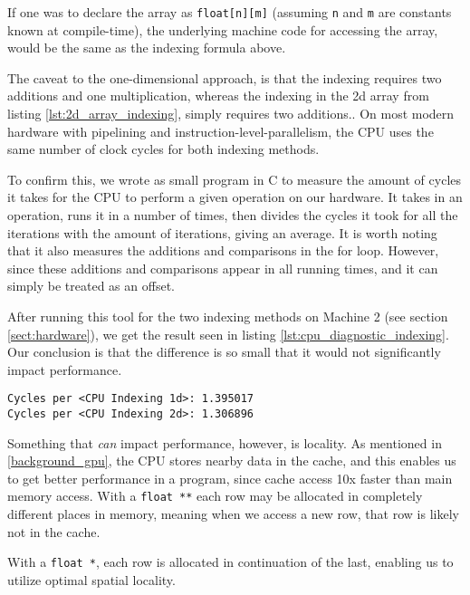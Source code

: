 If one was to declare the array as \texttt{float[n][m]} (assuming \texttt{n} and \texttt{m} are constants known at compile-time), the underlying machine code for accessing the array, would be the same as the indexing formula above.\cite[Ch. 1.2]{numericalrecipes}

The caveat to the one-dimensional approach, is that the indexing requires two additions and one multiplication, whereas the indexing in the 2d array from listing \ref{lst:2d_array_indexing}, simply requires two additions.\cite{numericalrecipes}. On most modern hardware with pipelining and instruction-level-parallelism, the CPU uses the same number of clock cycles for both indexing methods.

To confirm this, we wrote as small program in C to measure the amount of cycles it takes for the CPU to perform a given operation on our hardware. It takes in an operation, runs it in a number of times, then divides the cycles it took for all the iterations with the amount of iterations, giving an average. It is worth noting that it also measures the additions and comparisons in the for loop. However, since these additions and comparisons appear in all running times, and it can simply be treated as an offset.

After running this tool for the two indexing methods on Machine 2 (see section \ref{sect:hardware}), we get the result seen in listing \ref{lst:cpu_diagnostic_indexing}. Our conclusion is that the difference is so small that it would not significantly impact performance.

\begin{lstlisting}[caption={CPU Diagnostic for indexing methods.}, label={lst:cpu_diagnostic_indexing}]
Cycles per <CPU Indexing 1d>: 1.395017
Cycles per <CPU Indexing 2d>: 1.306896
\end{lstlisting}

Something that \textit{can} impact performance, however, is locality. As mentioned in \ref{background_gpu}, the CPU stores nearby data in the cache, and this enables us to get better performance in a program, since cache access 10x faster than main memory access. With a \texttt{float **} each row may be allocated in completely different places in memory, meaning when we access a new row, that row is likely not in the cache.

With a \texttt{float *}, each row is allocated in continuation of the last, enabling us to utilize optimal spatial locality.\\


